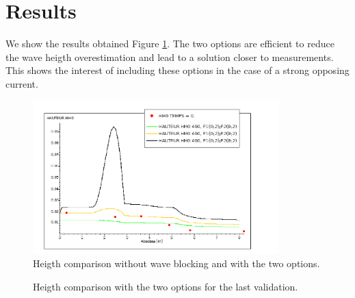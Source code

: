 \section{Results}
%
We show the results obtained Figure \ref{reswaveblocking}. The two options are
efficient to reduce the wave heigth overestimation and lead to a solution
closer to measurements. This shows the interest of including these options in
the case of a strong opposing current.

\begin{figure} [!h]
\centering
\includegraphics[width=0.85\textwidth]{hauteur.png}
 \caption{Heigth comparison without wave blocking and with the two options.}
\label{reswaveblocking}
\end{figure}

\begin{figure} [!h]
\centering
{}
 \caption{Heigth comparison with the two options for the last validation.}
\label{reswaveblocking2}
\end{figure}

